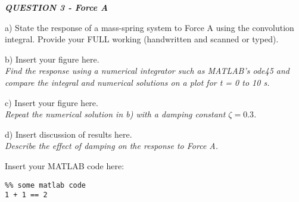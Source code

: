 \begin{tcolorbox}[colback=gray!50,enhanced,sharp corners,frame hidden,halign=left]
    \textbf{\textit{QUESTION 3 - Force A}}
\end{tcolorbox}

a) State the response of a mass-spring system to Force A using the convolution integral. Provide your FULL working (handwritten and scanned or typed).
\begin{flushright}
    [4 Marks*]
\end{flushright}







\noindent\makebox[\linewidth]{\rule{\linewidth}{0.4pt}}
b) Insert your figure here. \\
\textit{Find the response using a numerical integrator such as MATLAB’s ode45 and compare the integral and numerical solutions on a plot for t = 0 to 10 s. }
\begin{flushright}
\end{flushright}









\noindent\makebox[\linewidth]{\rule{\linewidth}{0.4pt}}
c) Insert your figure here. \\
\textit{Repeat the numerical solution in b) with a damping constant $\zeta = 0.3$.}
\begin{flushright}
\end{flushright}









\noindent\makebox[\linewidth]{\rule{\linewidth}{0.4pt}}
d) Insert discussion of results here. \\
\textit{Describe the effect of damping on the response to Force A.}
\begin{flushright}
\end{flushright}










\noindent\makebox[\linewidth]{\rule{\linewidth}{0.4pt}}
Insert your MATLAB code here:

\begin{lstlisting}
%% some matlab code
1 + 1 == 2
\end{lstlisting}


\clearpage



